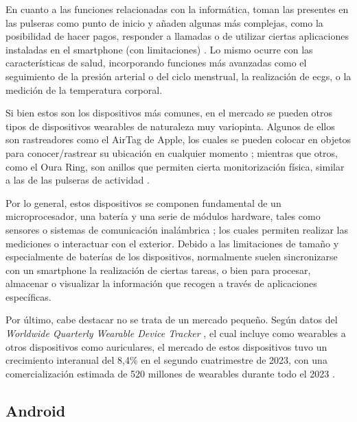         En cuanto a las funciones relacionadas con la informática, toman las presentes en las pulseras como punto de inicio y añaden algunas más complejas, como la posibilidad de hacer pagos, responder a llamadas o de utilizar ciertas aplicaciones instaladas en el \gls{smartphone} (con limitaciones) \cite{alcolea_samsung_2023}. Lo mismo ocurre con las características de salud, incorporando funciones más avanzadas como el seguimiento de la presión arterial o del ciclo menstrual, la realización de \glspl{ecg}, o la medición de la temperatura corporal.

        Si bien estos son los dispositivos más comunes, en el mercado se pueden otros tipos de dispositivos \glspl{wearable} de naturaleza muy variopinta. Algunos de ellos son rastreadores como el AirTag de Apple, los cuales se pueden colocar en objetos para conocer/rastrear su ubicación en cualquier momento \cite{raspall_airtag_2024}; mientras que otros, como el Oura Ring, son anillos que permiten cierta monitorización física, similar a las de las pulseras de actividad \cite{garcia_oura_2021}.

        Por lo general, estos dispositivos se componen fundamental de un microprocesador, una batería y una serie de módulos hardware, tales como sensores o sistemas de comunicación inalámbrica \cite{luque_ordonez_dispositivos_2016}; los cuales permiten realizar las mediciones o interactuar con el exterior. Debido a las limitaciones de tamaño y especialmente de baterías de los dispositivos, normalmente suelen sincronizarse con un \gls{smartphone} la realización de ciertas tareas, o bien para procesar, almacenar o visualizar la información que recogen a través de aplicaciones específicas.

        Por último, cabe destacar no se trata de un mercado pequeño. Según datos del \textit{Worldwide Quarterly Wearable Device Tracker} \cite{international_data_corporation_worldwide_nodate}, el cual incluye como \glspl{wearable} a otros dispositivos como auriculares, el mercado de estos dispositivos tuvo un crecimiento interanual del 8,4\% en el segundo cuatrimestre de 2023, con una comercialización estimada de 520 millones de \glspl{wearable} durante todo el 2023 \cite{ricca_resurreccion_2023}.
        
    \subsection{Android}
        \label{section:contexto:Android}
        

